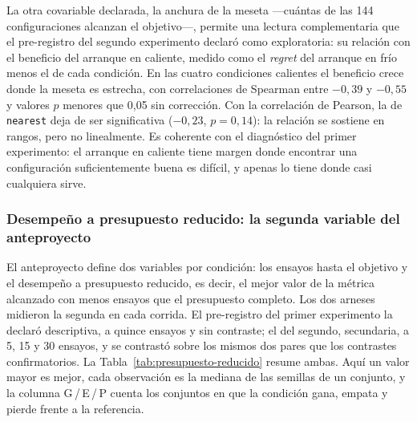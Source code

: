 \documentclass[12pt,letterpaper,oneside]{article}
\begin{document}
La otra covariable declarada, la anchura de la meseta ---cuántas de las 144 configuraciones
alcanzan el objetivo---, permite una lectura complementaria que el pre-registro del segundo
experimento declaró como exploratoria: su relación con el beneficio del arranque en caliente,
medido como el \textit{regret} del arranque en frío menos el de cada condición. En las cuatro
condiciones calientes el beneficio crece donde la meseta es estrecha, con correlaciones de
Spearman entre $-0{,}39$ y $-0{,}55$ y valores $p$ menores que 0,05 sin corrección. Con la
correlación de Pearson, la de \texttt{nearest} deja de ser significativa ($-0{,}23$,
$p = 0{,}14$): la relación se sostiene en rangos, pero no linealmente. Es coherente con el
diagnóstico del primer experimento: el arranque en caliente tiene margen donde encontrar una
configuración suficientemente buena es difícil, y apenas lo tiene donde casi cualquiera sirve.

\subsubsection{Desempeño a presupuesto reducido: la segunda variable del anteproyecto}
\label{sec:resultados-presupuesto}

El anteproyecto define dos variables por condición: los ensayos hasta el objetivo y el
desempeño a presupuesto reducido, es decir, el mejor valor de la métrica alcanzado con menos
ensayos que el presupuesto completo. Los dos arneses midieron la segunda en cada corrida. El
pre-registro del primer experimento la declaró descriptiva, a quince ensayos y sin contraste;
el del segundo, secundaria, a 5, 15 y 30 ensayos, y se contrastó sobre los mismos dos pares
que los contrastes confirmatorios. La Tabla~\ref{tab:presupuesto-reducido} resume ambas. Aquí
un valor mayor es mejor, cada observación es la mediana de las semillas de un conjunto, y la
columna G\,/\,E\,/\,P cuenta los conjuntos en que la condición gana, empata y pierde frente a
la referencia.
\end{document}
